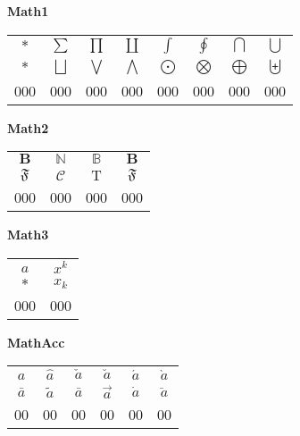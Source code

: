 \documentclass[12pt]{report}
\newlength{\mine}
\newlength{\niz}
\def\pmb{}
\begin{document}
\textbf{Math1}
\par\nobreak\vspace{2mm}
\begin{tabular}{|c|ccccccc|}
  \hline
   $\pmb *         $&
   $\pmb\sum       $&
   $\pmb\prod      $&
   $\pmb\coprod    $&
   $\pmb\int       $&
   $\pmb\oint      $&
   $\pmb\bigcap    $&
   $\pmb\bigcup    $\\[\mine]
   $\pmb *         $&
   $\pmb\bigsqcup  $&
   $\pmb\bigvee    $&
   $\pmb\bigwedge  $&
   $\pmb\bigodot   $&
   $\pmb\bigotimes $&
   $\pmb\bigoplus  $&
   $\pmb\biguplus  $\\[\niz]
  \hline\hline
  000&000&000&000&000&000&000&000\\
  \hline
\end{tabular}
\goodbreak\par\vspace{3mm}

\textbf{Math2}
\par\nobreak\vspace{2mm}
\begin{tabular}{|c|ccc|}
  \hline
   $\pmb{\mathbf{B}}$&
   $\pmb{\mathds{N}}$&
   $\pmb{\mathbb{B}}$&
   $\pmb{\mathbf{B}}$\\[\mine]
   $\pmb{\mathfrak{F}}$&
   $\pmb{\mathcal{C}}$&
   $\pmb{\mathrm{T}}$&
   $\pmb{\mathfrak{F}}$\\[\niz]
  \hline\hline
  000&000&000&000\\
  \hline
\end{tabular}
\goodbreak\par\vspace{3mm}

\textbf{Math3}
\par\nobreak\vspace{2mm}
\begin{tabular}{|c|c|}
  \hline
   $\pmb{\hat{a} } $&
   $\pmb{x^{k}}$\\[\mine]
   $\pmb *$&
   $\pmb{x_{k}}$\\[\niz]
  \hline\hline
  000&000\\
  \hline
\end{tabular}
\goodbreak\par\vspace{3mm}

\textbf{MathAcc}
\par\nobreak\vspace{2mm}
\begin{tabular}{|c|ccccc|}
  \hline
   $\pmb{\hat{a}  } $&
   $\pmb{\hat{a}  } $&
   $\pmb{\check{a}} $&
   $\pmb{\breve{a}} $&
   $\pmb{\acute{a}} $&
   $\pmb{\grave{a}} $\\[\mine]
   $\pmb{\bar{a}  } $&
   $\pmb{\tilde{a}} $&
   $\pmb{\bar{a}  } $&
   $\pmb{\vec{a}  } $&
   $\pmb{\dot{a}  } $&
   $\pmb{\ddot{a} } $\\[\niz]
  \hline\hline
  00&00&00&00&00&00\\
  \hline
\end{tabular}
\goodbreak\par\vspace{3mm}
\end{document}
